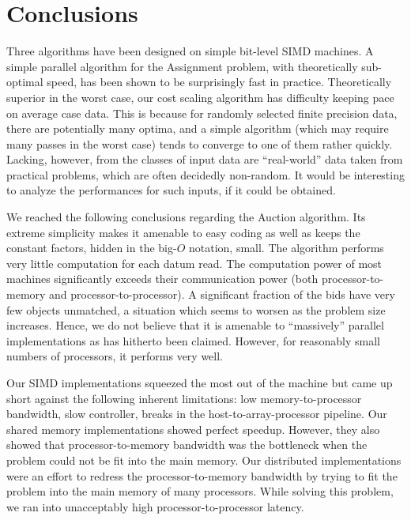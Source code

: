 \section{Conclusions}
\label{end}

Three algorithms have been designed on simple bit-level SIMD machines.  
A simple parallel algorithm for the Assignment problem, with 
theoretically sub-optimal speed, has been shown to be surprisingly 
fast in practice.  Theoretically superior in the worst case, our 
cost scaling algorithm has difficulty keeping pace on average 
case data.  This is because for randomly selected finite precision 
data, there are potentially many optima, and a simple algorithm 
(which may require many passes in the worst case) 
tends to converge to one of them rather quickly.  Lacking, however, 
from the classes of input data are ``real-world'' data taken 
from practical problems, which are often decidedly non-random.  
It would be interesting to analyze the performances for 
such inputs, if it could be obtained. 

We reached the following conclusions regarding the Auction algorithm.
Its extreme simplicity makes it amenable to easy coding as well
as keeps the constant factors, hidden in the big-$O$ notation, small.
The algorithm performs very little computation for each datum read.
The computation power of most machines significantly exceeds their
communication power (both processor-to-memory and processor-to-processor).
A significant fraction of the bids have very few objects unmatched, 
a situation which seems to worsen as the problem size increases.
Hence, we do not believe that it is amenable to ``massively'' 
parallel implementations as has hitherto been claimed. 
However, for reasonably small numbers of processors, it performs very well.

Our SIMD implementations squeezed the most out of the machine but
came up short against the following inherent limitations:
low memory-to-processor bandwidth, slow controller, breaks
in the host-to-array-processor pipeline. Our shared memory 
implementations showed perfect speedup. However, they also
showed that processor-to-memory bandwidth was the bottleneck
when the problem could not be fit into the main memory.
Our distributed implementations were an effort to redress the
processor-to-memory bandwidth by trying to fit the problem
into the main memory of many processors. While solving this problem,
we ran into unacceptably high processor-to-processor latency.

